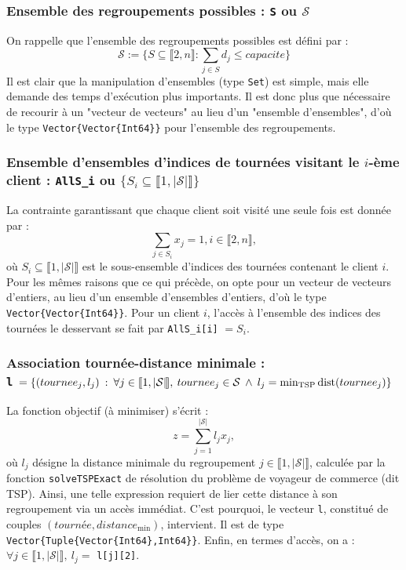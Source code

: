 \documentclass[french, 11pt, a4paper]{article} %
\newcommand{\Sc}{\mathcal{S}} %
\newcommand{\smb}{\smallbreak}
\begin{document}
\subsubsection{Ensemble des regroupements possibles : \texttt{S} ou $\Sc$}
On rappelle que l'ensemble des regroupements possibles est défini par :
\[\Sc := \Bigg\{ S \subseteq \llbracket 2,n \rrbracket : \sum_{j \in S} d_j \leq capacite \Bigg\} \]
Il est clair que la manipulation d'ensembles (type \verb+Set+) est simple, mais elle demande des temps d'exécution plus importants.
Il est donc plus que nécessaire de recourir à un "vecteur de vecteurs" au lieu d'un "ensemble d'ensembles", d'où
le type \verb+Vector{Vector{Int64}}+ pour l'ensemble des regroupements.

\subsubsection{Ensemble d'ensembles d'indices de tournées visitant le $i$-ème client : \texttt{AllS\_i} ou $\{S_i \subseteq \llbracket 1, |\Sc| \rrbracket\}$ }
La contrainte garantissant que chaque client soit visité une seule fois est donnée par :
\[ \sum_{j \in S_i} x_j = 1, i \in \llbracket 2,n \rrbracket, \]
où $S_i \subseteq \llbracket 1, |\Sc| \rrbracket$ est le sous-ensemble d'indices des tournées
contenant le client $i$.
Pour les mêmes raisons que ce qui précède, on opte pour un vecteur de vecteurs d'entiers, au lieu d'un ensemble d'ensembles d'entiers,
d'où le type \verb+Vector{Vector{Int64}}+.
\smb Pour un client $i$, l'accès à l'ensemble des indices des tournées le desservant se fait par \texttt{AllS\_i[i]} $=S_i$.

\subsubsection{Association tournée-distance minimale : \\ \texttt{l} 
$= \{(tournee_j,l_j) \: : \: \forall j \in \llbracket 1,|\Sc| \hspace{-0.15cm} \rrbracket,  \:
tournee_j \in \Sc 
\: \land \:
l_j = \min_{\text{\normalfont{TSP}}} \text{\normalfont{dist}}(tournee_j) \}$}

La fonction objectif (à minimiser) s'écrit :
\[ z = \sum_{j=1}^{|\Sc|} l_j x_j,\]
où $l_j$ désigne la distance minimale du regroupement $j \in \llbracket 1,|\Sc| \rrbracket$, calculée par la
fonction \verb+solveTSPExact+ de résolution du problème de voyageur de commerce (dit TSP).
Ainsi, une telle expression requiert de lier cette distance à son regroupement via un accès immédiat.
C'est pourquoi, le vecteur \verb+l+, constitué de couples $(tourn \text{é} e,distance_{\text{min}})$, intervient.
Il est de type \verb+Vector{Tuple{Vector{Int64},Int64}}+.
\smb Enfin, en termes d'accès, on a : $\forall j \in \llbracket 1,|\Sc| \rrbracket, \: l_j = $ \texttt{l[j][2]}.
\end{document}
